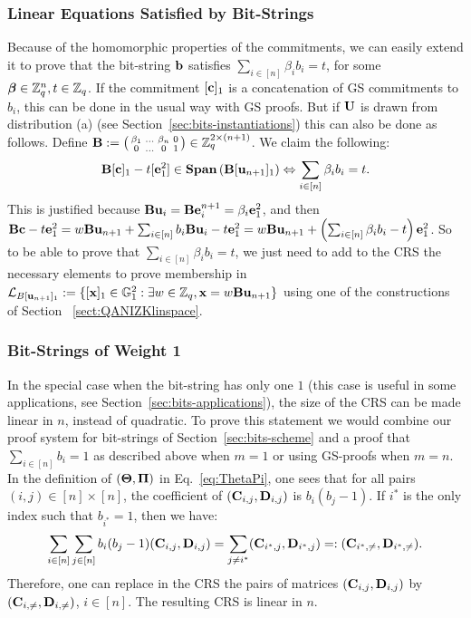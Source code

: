 \subsubsection{Linear Equations Satisfied by Bit-Strings}\label{sec:linear-eqs-bitstrings}
Because of the homomorphic properties of the commitments, 
we can easily extend it to prove that the bit-string $ \mathbf{b}$ satisfies $\sum_{i \in [n]} \beta_i b_i=t$, for some ${\boldsymbol \beta} \in \mathbb{Z}_q^{n}, t\in \mathbb{Z}_q$. 
If the commitment $[\mathbf{c}]_1$ is a concatenation of GS commitments to $b_i$, this can be done in the usual way with GS proofs. 
But if $\mathbf{{U}}$ is drawn from distribution (a) (see Section~\ref{sec:bits-instantiations})
this can also be done as follows. 
Define $\mathbf{{B}}:=\left(\begin{smallmatrix} \beta_1 & \ldots & \beta_n & 0\\ 0 & \ldots & 0 &1\end{smallmatrix}\right)
\in \mathbb{Z}_q^{2\times (n+1)}$. %
We claim the following:
$$\mathbf{{B}}[\mathbf{c}]_1- t [\mathbf{e}^{2}_{1}] \in \mathbf{Span}\left(\mathbf{{B}}[\mathbf{u}_{n+1}]_1\right) \Leftrightarrow \sum_{i \in [n]}\beta_i  b_i=t.$$
This is justified because
$\mathbf{{B}}\mathbf{u}_i = \mathbf{{B}}\mathbf{e}^{n+1}_i=\beta_i\mathbf{e}_1^{2}$, and then
$ \mathbf{{B}}\mathbf{c}- t \mathbf{e}^{2}_{1}=w  \mathbf{{B}} \mathbf{u}_{n+1}+ \sum_{i \in [n]} b_i \mathbf{{B}} \mathbf{u}_{i} - t \mathbf{e}^{2}_1=w\mathbf{{B}}\mathbf{u}_{n+1}+\left(\sum_{i\in[n]}\beta_i b_i-t\right)\mathbf{e}_1^2$.
So to be able to prove that $\sum_{i \in [n]} \beta_i b_i=t$, we just need to add to the CRS the necessary elements to prove membership 
in $\mathcal{L}_{B[\mathbf{u}_{n+1}]_1}:=\{ [\mathbf{x}]_1 \in \mathbb{G}_1^2: \exists w \in \mathbb{Z}_q,  \mathbf{x} = w\mathbf{{B}}\mathbf{u}_{n+1} \}$ using one of the constructions of Section~
\ref{sect:QANIZKlinspace}.

\subsubsection{Bit-Strings of Weight 1}  In the special
case when the bit-string has only one $1$ (this case is useful in some applications, see Section~\ref{sec:bits-applications}),  the size of the CRS can be made linear in $n$, instead of quadratic.
To prove this statement we would combine our proof system for bit-strings of Section~\ref{sec:bits-scheme} and a proof that  $\sum_{i \in [n]} b_i=1$ as described above
when $m=1$ or using GS-proofs when $m=n$.
In the definition of $(\mathbf{{\Theta}},\mathbf{{\Pi}})$ in Eq.~\ref{eq:ThetaPi}, one 
sees that for all pairs $(i,j) \in [n] \times [n]$, the coefficient of $(\mathbf{C}_{i,j},\mathbf{D}_{i,j})$ is $b_i(b_j-1)$.
If $i^*$ is the only index such that $b_{i^*}=1$, then we have:
$$\sum_{i \in [n]} \sum_{j \in [n]} b_i(b_j-1) (\mathbf{C}_{i,j},\mathbf{D}_{i,j}) = \sum_{j \neq i^*} (\mathbf{C}_{i^*,j},\mathbf{D}_{i^*,j})=: (\mathbf{C}_{i^*,\neq},\mathbf{D}_{i^*,\neq}).$$
Therefore, one can replace in the CRS the pairs of matrices  $ (\mathbf{C}_{i,j},\mathbf{D}_{i,j})$ by  $(\mathbf{C}_{i,\neq},\mathbf{D}_{i,\neq})$, $i \in [n]$. The resulting CRS is linear in $n$.

